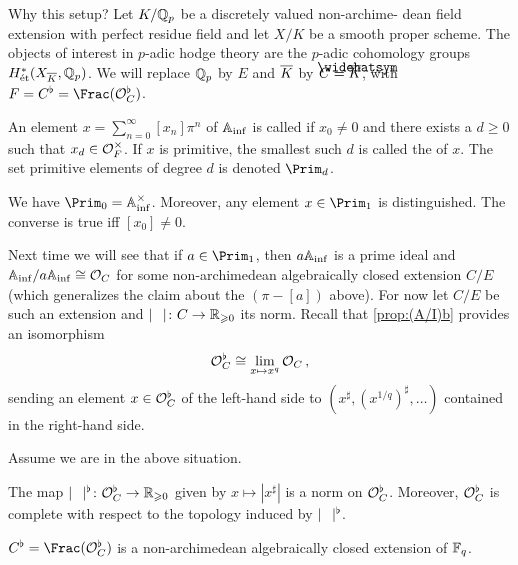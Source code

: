 Why this setup? Let $K/\mathbb{Q}_p$ be a discretely valued non-archime-
dean field extension with perfect residue field and let $X/K$ be a smooth proper scheme.  The objects of interest in $p$-adic hodge theory are the $p$-adic cohomology groups $H_\et^*(X_{\ov{K}},\IQ_p)$. We will replace $\mathbb{Q}_p$ by $E$ and $\ov{K}$ by $C=\roof{\ov{K}}$, with $F=C^\flat=\Frac(\Oo_C^\flat)$.
\begin{defi}
	An element $x=\sum_{n=0}^\infty [x_n]\pi^n$ of $\mathbb{A}_{\mathrm{inf}}$ is called  if $x_0\neq 0$ and there exists a $d\geq 0$ such that $x_d\in \mathcal{O}_F^\times$. If $x$ is primitive, the smallest such $d$ is called the  of $x$. The set primitive elements of degree $d$ is denoted $\Prim_d$.
\end{defi}
\begin{exm}
	We have $\Prim_0=\IA_\inf^\times$. Moreover, any element $x\in \Prim_1$ is distinguished. The converse is true iff $[x_0]\neq 0$.
\end{exm}
Next time we will see that if $a\in \Prim_1$, then $a\mathbb{A}_{\mathrm{inf}}$ is  a prime ideal and $\mathbb{A}_{\mathrm{inf}}/a\mathbb{A}_{\mathrm{inf}}\cong \mathcal{O}_C$ for some non-archimedean algebraically closed extension $C/E$ (which generalizes the claim about the $(\pi-[a])$ above). For now let $C/E$ be such an extension and $|\blank|\colon C\morphism \IR_{\geq 0}$ its norm. Recall that \cref{prop:(A/I)b} provides an isomorphism
\begin{equation*}
	\mathcal{O}_C^\flat\cong \operatorname*{lim}_{x\mapsto x^q}\mathcal{O}_C\,,
\end{equation*}
sending an element $x\in \mathcal{O}_C^\flat$ of the left-hand side to $(x^\sharp, (x^{1/q})^\sharp,\dotsc)$ contained in the right-hand side.
\begin{lem}\label{lem:OcflatisOF}
	Assume we are in the above situation.
	\begin{numerate}
		\item The map $|\blank|^\flat\colon \Oo_C^\flat\morphism\IR_{\geq 0}$ given by $x\mapsto |x^\sharp|$ is a norm on $\mathcal{O}_C^\flat$. Moreover, $\mathcal{O}_C^\flat$ is complete with respect to the topology induced by $|\blank|^\flat$.
		\item $C^\flat=\Frac(\Oo_C^\flat)$ is a non-archimedean algebraically closed extension of $\mathbb{F}_q$.
	\end{numerate}
\end{lem}
